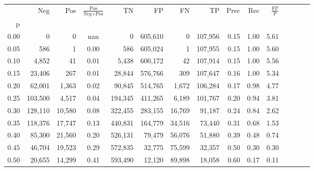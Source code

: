 \begin{tabular}{rrrcrrrrrrrrrrr}
\toprule
{} &      Neg &     Pos & $\frac{\text{Pos}}{\text{Neg}+\text{Pos}}$ &       TN &       FP &       FN &       TP &  Prec &   Rec & $\frac{\text{FP}}{\text{P}}$ \\
p    &          &         &                                            &          &          &          &          &       &       &                              \\
\midrule
0.00 &        0 &       0 &                                        nan &        0 &  605,610 &        0 &  107,956 &  0.15 &  1.00 &                         5.61 \\
0.05 &      586 &       1 &                                       0.00 &      586 &  605,024 &        1 &  107,955 &  0.15 &  1.00 &                         5.60 \\
0.10 &    4,852 &      41 &                                       0.01 &    5,438 &  600,172 &       42 &  107,914 &  0.15 &  1.00 &                         5.56 \\
0.15 &   23,406 &     267 &                                       0.01 &   28,844 &  576,766 &      309 &  107,647 &  0.16 &  1.00 &                         5.34 \\
0.20 &   62,001 &   1,363 &                                       0.02 &   90,845 &  514,765 &    1,672 &  106,284 &  0.17 &  0.98 &                         4.77 \\
0.25 &  103,500 &   4,517 &                                       0.04 &  194,345 &  411,265 &    6,189 &  101,767 &  0.20 &  0.94 &                         3.81 \\
0.30 &  128,110 &  10,580 &                                       0.08 &  322,455 &  283,155 &   16,769 &   91,187 &  0.24 &  0.84 &                         2.62 \\
0.35 &  118,376 &  17,747 &                                       0.13 &  440,831 &  164,779 &   34,516 &   73,440 &  0.31 &  0.68 &                         1.53 \\
0.40 &   85,300 &  21,560 &                                       0.20 &  526,131 &   79,479 &   56,076 &   51,880 &  0.39 &  0.48 &                         0.74 \\
0.45 &   46,704 &  19,523 &                                       0.29 &  572,835 &   32,775 &   75,599 &   32,357 &  0.50 &  0.30 &                         0.30 \\
0.50 &   20,655 &  14,299 &                                       0.41 &  593,490 &   12,120 &   89,898 &   18,058 &  0.60 &  0.17 &                         0.11 \\

\end{tabular}
